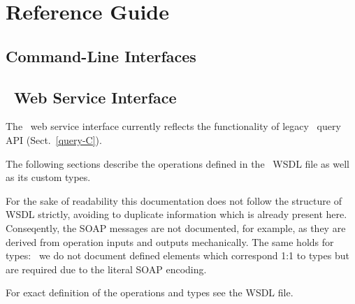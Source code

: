 \section{Reference Guide}


\subsection{Command-Line Interfaces}
\label{cmdln_interface}


\newpage

\subsection{\LB\ Web Service Interface}

The \LB\ web service interface currently reflects the functionality of legacy
\LB\ query API (Sect.~\ref{query-C}).

The following sections describe the operations defined in the \LB\ WSDL
file as well as its custom types.

For the sake of readability this documentation does not follow the structure
of WSDL strictly, avoiding to duplicate information which is already present
here.
Conseqently, the SOAP messages are not documented, for example, as they
are derived from operation inputs and outputs mechanically.
The same holds for types: \eg\ we do not document defined elements
which correspond 1:1 to types but are required due to the literal SOAP
encoding.

For exact definition of the operations and types see the WSDL file.

\endinput
